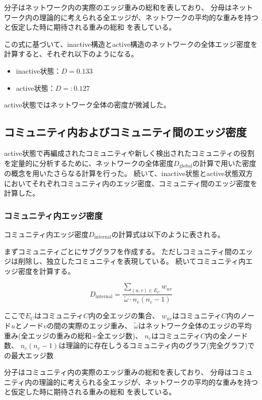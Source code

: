 分子はネットワーク内の実際のエッジ重みの総和を表しており、
分母はネットワーク内の理論的に考えられる全エッジが、ネットワークの平均的な重みを持つと仮定した時に期待される重みの総和
を表している。

この式に基づいて、inactive構造とactive構造のネットワークの全体エッジ密度を計算すると、それぞれ以下のようになる。
\begin{itemize}
    \item inactive状態：\( D = 0.133 \)
    \item active状態：\( D = :0.127 \)
\end{itemize}

active状態ではネットワーク全体の密度が微減した。

\subsection{コミュニティ内およびコミュニティ間のエッジ密度}
active状態で再編成されたコミュニティや新しく検出されたコミュニティの役割を定量的に分析するために、ネットワークの全体密度$D_{\text{global}}$の計算で用いた密度の概念を用いたさらなる計算を行った。
続いて、inactive状態とactive状態双方においてそれぞれコミュニティ内のエッジ密度、コミュニティ間のエッジ密度を計算した。

\subsubsection{コミュニティ内エッジ密度}
コミュニティ内エッジ密度$D_{\text{internal}}$の計算式は以下のように表される。

まずコミュニティごとにサブグラフを作成する。
ただしコミュニティ間のエッジは削除し、独立したコミュニティを表現している。
続いてコミュニティ内エッジ密度を計算する。

\begin{equation}
  D_{\text{internal}} = \frac{\sum_{(u,v) \in E_C} w_{uv}}{\tilde{\omega} \cdot n_c (n_c - 1)}
  \label{eq:internal_density}
  \end{equation}

ここで$E_C$はコミュニティ$C$内の全エッジの集合、
$w_{uv}$はコミュニティ$C$内のノード$u$とノード$v$の間の実際のエッジ重み、
$\tilde{\omega}$はネットワーク全体のエッジの平均重み(全エッジの重みの総和÷全エッジ数)、
$n_c$はコミュニティ$C$内の全ノード数、
$n_c (n_c - 1)$は理論的に存在しうるコミュニティ内のグラフ(完全グラフ)での最大エッジ数

分子はコミュニティ内の実際のエッジ重みの総和を表しており、
分母はコミュニティ内の理論的に考えられる全エッジが、ネットワークの平均的な重みを持つと仮定した時に期待される重みの総和
を表している。

